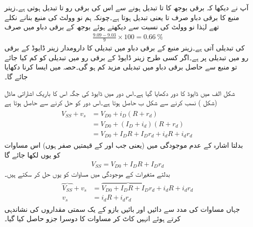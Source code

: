 آپ نے دیکھا کہ برقی بوجھ کا  تا  تبدیل ہونے سے اس کی برقی رو  تا   تبدیل ہوتی ہے۔زینر منبع کا برقی دباو صرف  تا  یعنی  تبدیل ہوتا ہے۔چونکہ ہم نو وولٹ کی منبع بنانے نکلے تھے لہٰذا نو وولٹ کی نسبت سے دیکھتے ہوئے بوجھ کے برقی دباو  میں صرف
\begin{align*}
\frac{9.09-9.03}{9} \times 100=\SI{0.66}{\percent}
\end{align*}
کی تبدیلی آتی ہے۔زینر منبع کے برقی دباو میں تبدیلی کا دارومدار زینر ڈایوڈ کے برقی رو میں تبدیلی پر ہے۔اگر کسی طرح زینر ڈایوڈ کے برقی رو میں تبدیلی کو کم کیا جائے تو منبع سے حاصل برقی دباو میں تبدیلی مزید کم ہو گی۔حصہ  میں ایسا کرنا دکھایا جائے گا۔

شکل  الف میں ڈایوڈ کا دور دکھایا گیا ہے۔اس دور میں ڈایوڈ کی جگہ اس کا باریک اشاراتی ماڈل (شکل 
  ) نسب کرنے سے شکل  ب حاصل ہوتا ہے۔اس دور کو حل کرنے سے حاصل ہوتا ہے
\begin{gather} \label{مساوات_ڈایوڈ_اشارہ_موجود}
\begin{aligned}
V_{SS}+v_s&=V_{D0}+i_D (R+r_d )\\
&=V_{D0}+(I_D+i_d)(R+r_d)\\
&=V_{D0}+I_D R + I_D r_d + i_d R + i_d r_d\
\end{aligned}
\end{gather}
بدلتا اشارہ کے عدم موجودگی میں (یعنی جب   اور  کے قیمتیں صفر ہوں) اس مساوات کو یوں لکھا جائے گا
\begin{align} \label{مساوات_ڈایوڈ_اشارہ_عدم_موجود}
V_{SS}=V_{D0}+I_D R +I_D r_d
\end{align}
بدلتے متغیرات کے موجودگی میں مساوات   کو یوں حل کر سکتے ہیں۔
\begin{gather} \label{مساوات_ڈایوڈ_باریک_اشاراتی_مساوات}
\begin{aligned}
\overbrace{V_{SS}}+v_s &=\overbrace{V_{D0}+I_D R + I_D r_d}+i_d R + i_d r_d\\
v_s &= i_d R + i_d r_d
\end{aligned}
\end{gather}
جہاں مساوات   کی مدد سے دائیں اور بائیں بازو کے یک سمتی مقداروں کی نشاندہی کرتے ہوئے انہیں کاٹ کر مساوات کا دوسرا جزو حاصل کیا گیا۔

